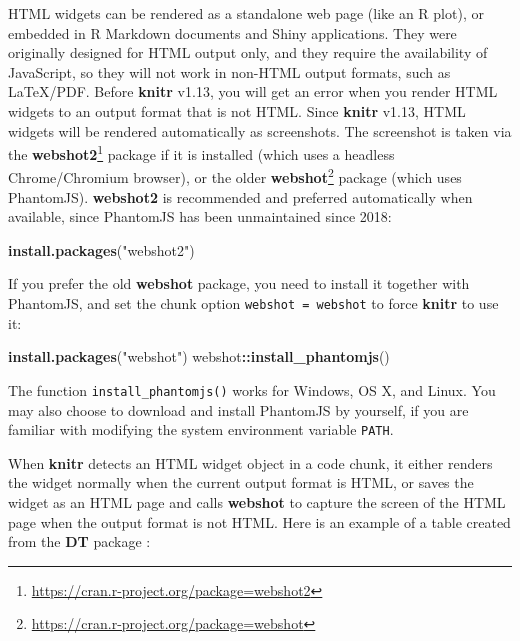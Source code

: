 \documentclass[
  12pt,
]{krantz}
\newenvironment{Shaded}{\begin{snugshade}}{\end{snugshade}}
\newcommand{\FunctionTok}[1]{\textcolor[rgb]{0.13,0.29,0.53}{\textbf{#1}}}
\newcommand{\NormalTok}[1]{#1}
\newcommand{\SpecialCharTok}[1]{\textcolor[rgb]{0.81,0.36,0.00}{\textbf{#1}}}
\newcommand{\StringTok}[1]{\textcolor[rgb]{0.31,0.60,0.02}{#1}}
\renewcommand{\href}[2]{#2\footnote{\url{#1}}}
\theoremstyle{definition}
\theoremstyle{definition}
\theoremstyle{definition}
\theoremstyle{definition}
\theoremstyle{remark}
\begin{document}
HTML widgets can be rendered as a standalone web page (like an R plot), or embedded in R Markdown documents and Shiny applications. They were originally designed for HTML output only, and they require the availability of JavaScript, so they will not work in non-HTML output formats, such as LaTeX/PDF. Before \textbf{knitr} v1.13, you will get an error when you render HTML widgets to an output format that is not HTML. Since \textbf{knitr} v1.13, HTML widgets will be rendered automatically as screenshots. The screenshot is taken via the \href{https://cran.r-project.org/package=webshot2}{\textbf{webshot2}} package \citep{R-webshot2} if it is installed (which uses a headless Chrome/Chromium browser), or the older \href{https://cran.r-project.org/package=webshot}{\textbf{webshot}} package \citep{R-webshot} (which uses PhantomJS). \textbf{webshot2} is recommended and preferred automatically when available, since PhantomJS has been unmaintained since 2018:

\begin{Shaded}
\begin{Highlighting}[]
\FunctionTok{install.packages}\NormalTok{(}\StringTok{"webshot2"}\NormalTok{)}
\end{Highlighting}
\end{Shaded}

If you prefer the old \textbf{webshot} package, you need to install it together with PhantomJS, and set the chunk option \texttt{webshot\ =\ \textquotesingle{}webshot\textquotesingle{}} to force \textbf{knitr} to use it:

\begin{Shaded}
\begin{Highlighting}[]
\FunctionTok{install.packages}\NormalTok{(}\StringTok{"webshot"}\NormalTok{)}
\NormalTok{webshot}\SpecialCharTok{::}\FunctionTok{install\_phantomjs}\NormalTok{()}
\end{Highlighting}
\end{Shaded}

The function \texttt{install\_phantomjs()} works for Windows, OS X, and Linux. You may also choose to download and install PhantomJS by yourself, if you are familiar with modifying the system environment variable \texttt{PATH}.

When \textbf{knitr} detects an HTML widget object in a code chunk, it either renders the widget normally when the current output format is HTML, or saves the widget as an HTML page and calls \textbf{webshot} to capture the screen of the HTML page when the output format is not HTML. Here is an example of a table created from the \textbf{DT} package \citep{R-DT}:
\end{document}
